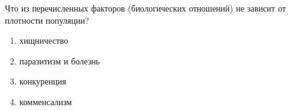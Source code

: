 
Что из перечисленных факторов (биологических отношений) не зависит от плотности популяции?

\begin{enumerate}
    \item хищничество
    \item паразитизм и болезнь
    \item конкуренция
    \item комменсализм
\end{enumerate}

